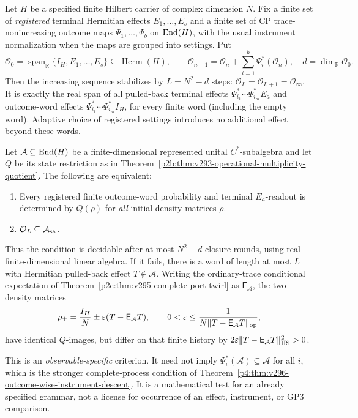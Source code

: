 \documentclass[12pt,a4paper]{article}
\begin{document}
\begin{theorem}
\label{p4a:thm:v297-finite-outcome-word-saturation}
Let $H$ be a specified finite Hilbert carrier of complex dimension $N$.
Fix a finite set of \emph{registered} terminal Hermitian effects
$E_1,\ldots,E_s$ and a finite set of CP trace-nonincreasing outcome maps
$\Psi_1,\ldots,\Psi_b$ on $\operatorname{End}(H)$, with the usual instrument
normalization when the maps are grouped into settings. Put
\[
 \mathcal O_0=\operatorname{span}_{\mathbb R}
 \{I_H,E_1,\ldots,E_s\}\subseteq\operatorname{Herm}(H),\qquad
 \mathcal O_{n+1}=\mathcal O_n+
 \sum_{i=1}^b\Psi_i^*(\mathcal O_n),
 \quad d=\dim_{\mathbb R}\mathcal O_0.
\]
Then the increasing sequence stabilizes by $L=N^2-d$ steps:
$\mathcal O_L=\mathcal O_{L+1}=\mathcal O_\infty$.
It is exactly the real span of all pulled-back terminal effects
$\Psi_{i_1}^*\cdots\Psi_{i_m}^*E_a$ and outcome-word effects
$\Psi_{i_1}^*\cdots\Psi_{i_m}^*I_H$, for every finite word
(including the empty word). Adaptive choice of registered settings
introduces no additional effect beyond these words.

Let $\mathcal A\subseteq\operatorname{End}(H)$ be a finite-dimensional represented
unital $C^*$-subalgebra and let $Q$ be its state restriction as in
Theorem~\ref{p2b:thm:v293-operational-multiplicity-quotient}.
The following are equivalent:
\begin{enumerate}[label=(\roman*),leftmargin=2em]
\item Every registered finite outcome-word probability and terminal
$E_a$-readout is determined by $Q(\rho)$ for \emph{all} initial density
matrices $\rho$.
\item $\mathcal O_L\subseteq\mathcal A_{\rm sa}$.
\end{enumerate}
Thus the condition is decidable after at most $N^2-d$ closure rounds,
using real finite-dimensional linear algebra. If it fails, there is a
word of length at most $L$ with Hermitian pulled-back effect
$T\notin\mathcal A$. Writing the ordinary-trace conditional expectation
of Theorem~\ref{p2c:thm:v295-complete-port-twirl} as
$\mathsf E_{\mathcal A}$, the two density matrices
\[
 \rho_\pm=\frac{I_H}{N}\pm\varepsilon
 (T-\mathsf E_{\mathcal A}T),\qquad
 0<\varepsilon\le
 \frac{1}{N\|T-\mathsf E_{\mathcal A}T\|_{\rm op}},
\]
have identical $Q$-images, but differ on that finite history by
$2\varepsilon\|T-\mathsf E_{\mathcal A}T\|_{\rm HS}^2>0$.

This is an \emph{observable-specific} criterion. It need not imply
$\Psi_i^*(\mathcal A)\subseteq\mathcal A$ for all $i$, which is the
stronger complete-process condition of
Theorem~\ref{p4:thm:v296-outcome-wise-instrument-descent}.
It is a mathematical test for an already specified grammar, not a
license for occurrence of an effect, instrument, or GP3 comparison.
\end{theorem}
\end{document}
